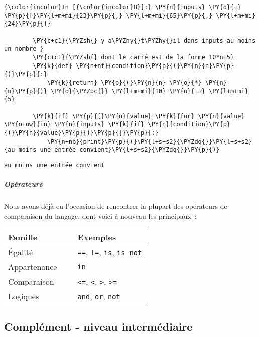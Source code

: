     \begin{Verbatim}[commandchars=\\\{\},frame=single,framerule=0.3mm,rulecolor=\color{cellframecolor}]
{\color{incolor}In [{\color{incolor}8}]:} \PY{n}{inputs} \PY{o}{=} \PY{p}{[}\PY{l+m+mi}{23}\PY{p}{,} \PY{l+m+mi}{65}\PY{p}{,} \PY{l+m+mi}{24}\PY{p}{]}
        
        \PY{c+c1}{\PYZsh{} y a\PYZhy{}t\PYZhy{}il dans inputs au moins un nombre }
        \PY{c+c1}{\PYZsh{} dont le carré est de la forme 10*n+5}
        \PY{k}{def} \PY{n+nf}{condition}\PY{p}{(}\PY{n}{n}\PY{p}{)}\PY{p}{:}
            \PY{k}{return} \PY{p}{(}\PY{n}{n} \PY{o}{*} \PY{n}{n}\PY{p}{)} \PY{o}{\PYZpc{}} \PY{l+m+mi}{10} \PY{o}{==} \PY{l+m+mi}{5}
        
        \PY{k}{if} \PY{p}{[}\PY{n}{value} \PY{k}{for} \PY{n}{value} \PY{o+ow}{in} \PY{n}{inputs} \PY{k}{if} \PY{n}{condition}\PY{p}{(}\PY{n}{value}\PY{p}{)}\PY{p}{]}\PY{p}{:}
            \PY{n+nb}{print}\PY{p}{(}\PY{l+s+s2}{\PYZdq{}}\PY{l+s+s2}{au moins une entrée convient}\PY{l+s+s2}{\PYZdq{}}\PY{p}{)}
\end{Verbatim}


    \begin{Verbatim}[commandchars=\\\{\},frame=single,framerule=0.3mm,rulecolor=\color{cellframecolor}]
au moins une entrée convient
\end{Verbatim}

    \hypertarget{opuxe9rateurs}{%
\subparagraph{Opérateurs}\label{opuxe9rateurs}}

    Nous avons déjà eu l'occasion de rencontrer la plupart des opérateurs de
comparaison du langage, dont voici à nouveau les principaux~:

\begin{longtable}[]{@{}lll@{}}
\toprule
Famille & ~ & Exemples\tabularnewline
\midrule
\endhead
Égalité & ~ & \texttt{==}, \texttt{!=}, \texttt{is},
\texttt{is\ not}\tabularnewline
Appartenance & ~ & \texttt{in}\tabularnewline
Comparaison & ~ & \texttt{\textless{}=}, \texttt{\textless{}},
\texttt{\textgreater{}}, \texttt{\textgreater{}=}\tabularnewline
Logiques & ~ & \texttt{and}, \texttt{or}, \texttt{not}\tabularnewline
\bottomrule
\end{longtable}

    \hypertarget{compluxe9ment---niveau-intermuxe9diaire}{%
\subsection{Complément - niveau
intermédiaire}\label{compluxe9ment---niveau-intermuxe9diaire}}

